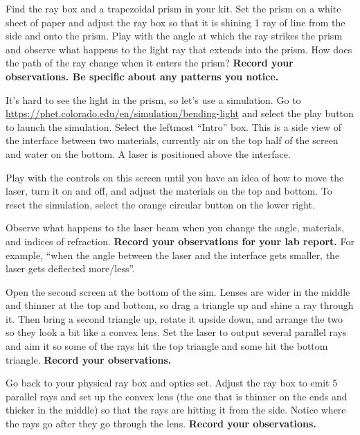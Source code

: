 \begin{steps}
	\item Find the ray box and a trapezoidal prism in your kit. Set the prism on a white sheet of paper and adjust the ray box so that it is shining 1 ray of line from the side and onto the prism. Play with the angle at which the ray strikes the prism and observe what happens to the light ray that extends into the prism. How does the path of the ray change when it enters the prism? \textbf{Record your observations. Be specific about any patterns you notice.}
	
	\item It's hard to see the light in the prism, so let's use a simulation. Go to \url{https://phet.colorado.edu/en/simulation/bending-light} and select the play button to launch the simulation. Select the leftmost ``Intro'' box. This is a side view of the interface between two materials, currently air on the top half of the screen and water on the bottom. A laser is positioned above the interface.
	
	\item Play with the controls on this screen until you have an idea of how to move the laser, turn it on and off, and adjust the materials on the top and bottom. To reset the simulation, select the orange circular button on the lower right.
	
	\item Observe what happens to the laser beam when you change the angle, materials, and indices of refraction. \textbf{Record your observations for your lab report.} For example, ``when the angle between the laser and the interface gets smaller, the laser gets deflected more/less''.
	
	\item Open the second screen at the bottom of the sim. Lenses are wider in the middle and thinner at the top and bottom, so drag a triangle up and shine a ray through it. Then bring a second triangle up, rotate it upside down, and arrange the two so they look a bit like a convex lens. Set the laser to output several parallel rays and aim it so some of the rays hit the top triangle and some hit the bottom triangle. \textbf{Record your observations.}
	
	\item Go back to your physical ray box and optics set. Adjust the ray box to emit 5 parallel rays and set up the convex lens (the one that is thinner on the ends and thicker in the middle) so that the rays are hitting it from the side. Notice where the rays go after they go through the lens. \textbf{Record your observations.}
\end{steps}

